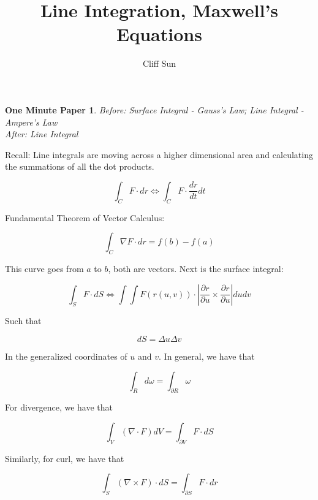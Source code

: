 \documentclass{article}
\title{Line Integration, Maxwell's Equations}
\author{Cliff Sun}
\newtheorem{one minute paper}[theorem]{One Minute Paper}
\begin{document}
\maketitle

\begin{one minute paper}
    Before: Surface Integral - Gauss's Law; Line Integral - Ampere's Law \\

    After: Line Integral
\end{one minute paper}

Recall: Line integrals are moving across a higher dimensional area and calculating the summations 
of all the dot products. 

\begin{equation}
    \int_{C}F \cdot dr \iff \int_{C}F \cdot \frac{dr}{dt}dt
\end{equation}

Fundamental Theorem of Vector Calculus:

\begin{equation}
    \int_{C}\nabla F \cdot dr = f(b) - f(a)
\end{equation}

This curve goes from $a$ to $b$, both are vectors. Next is the surface integral:

\begin{equation}
    \int_{S} F \cdot dS \iff \int\int F(r(u,v)) \cdot |\frac{\partial r}{\partial u} \times \frac{\partial r}{\partial u}|dudv
\end{equation}

Such that 

\begin{equation}
    dS = \Delta u \Delta v
\end{equation}

In the generalized coordinates of $u$ and $v$. In general, we have that 

\begin{equation}
    \int_{R}d\omega = \int_{\partial R}\omega
\end{equation}

For divergence, we have that

\begin{equation}
    \int_V (\nabla \cdot F)dV = \int_{\partial V}F \cdot dS
\end{equation}

Similarly, for curl, we have that

\begin{equation}
    \int_S (\nabla \times F) \cdot dS = \int_{\partial S} F \cdot dr
\end{equation}
\end{document}
